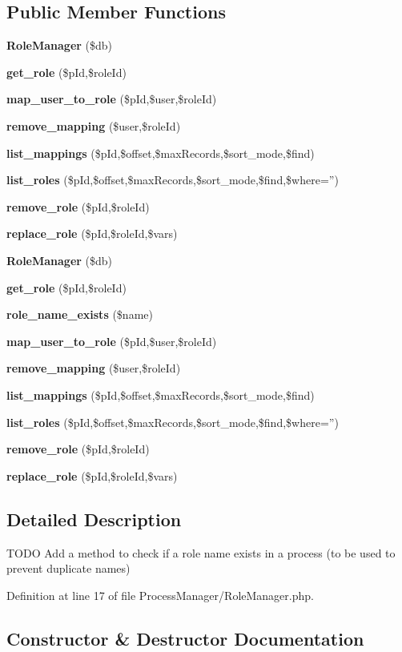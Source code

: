 \subsection*{Public Member Functions}
\begin{CompactItemize}
\item 
{\bf Role\-Manager} (\$db)
\item 
{\bf get\_\-role} (\$p\-Id,\$role\-Id)
\item 
{\bf map\_\-user\_\-to\_\-role} (\$p\-Id,\$user,\$role\-Id)
\item 
{\bf remove\_\-mapping} (\$user,\$role\-Id)
\item 
{\bf list\_\-mappings} (\$p\-Id,\$offset,\$max\-Records,\$sort\_\-mode,\$find)
\item 
{\bf list\_\-roles} (\$p\-Id,\$offset,\$max\-Records,\$sort\_\-mode,\$find,\$where='')
\item 
{\bf remove\_\-role} (\$p\-Id,\$role\-Id)
\item 
{\bf replace\_\-role} (\$p\-Id,\$role\-Id,\$vars)
\item 
{\bf Role\-Manager} (\$db)
\item 
{\bf get\_\-role} (\$p\-Id,\$role\-Id)
\item 
{\bf role\_\-name\_\-exists} (\$name)
\item 
{\bf map\_\-user\_\-to\_\-role} (\$p\-Id,\$user,\$role\-Id)
\item 
{\bf remove\_\-mapping} (\$user,\$role\-Id)
\item 
{\bf list\_\-mappings} (\$p\-Id,\$offset,\$max\-Records,\$sort\_\-mode,\$find)
\item 
{\bf list\_\-roles} (\$p\-Id,\$offset,\$max\-Records,\$sort\_\-mode,\$find,\$where='')
\item 
{\bf remove\_\-role} (\$p\-Id,\$role\-Id)
\item 
{\bf replace\_\-role} (\$p\-Id,\$role\-Id,\$vars)
\end{CompactItemize}


\subsection{Detailed Description}
TODO Add a method to check if a role name exists in a process (to be used to prevent duplicate names) 



Definition at line 17 of file Process\-Manager/Role\-Manager.php.

\subsection{Constructor \& Destructor Documentation}
